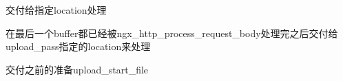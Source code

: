 \documentclass[aspectratio=169]{ctexbeamer}
\begin{document}
\begin{frame}{\subsecname}{交付给指定location处理}
  

  在最后一个buffer都已经被ngx\_http\_process\_request\_body处理完之后交付给upload\_pass指定的location来处理
\end{frame}

\begin{frame}{\subsecname}{交付之前的准备upload\_start\_file}
  
\end{frame}
\end{document}
